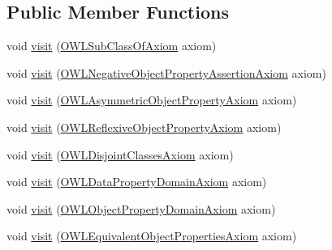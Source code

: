 \subsection*{Public Member Functions}
\begin{DoxyCompactItemize}
\item 
void \hyperlink{classorg_1_1semanticweb_1_1owlapi_1_1util_1_1_o_w_l_axiom_type_processor_a053014bbddab01a0b4ac885d06d4bde1}{visit} (\hyperlink{interfaceorg_1_1semanticweb_1_1owlapi_1_1model_1_1_o_w_l_sub_class_of_axiom}{O\-W\-L\-Sub\-Class\-Of\-Axiom} axiom)
\item 
void \hyperlink{classorg_1_1semanticweb_1_1owlapi_1_1util_1_1_o_w_l_axiom_type_processor_afaf6f4630c1920bf17093d27dfecbb96}{visit} (\hyperlink{interfaceorg_1_1semanticweb_1_1owlapi_1_1model_1_1_o_w_l_negative_object_property_assertion_axiom}{O\-W\-L\-Negative\-Object\-Property\-Assertion\-Axiom} axiom)
\item 
void \hyperlink{classorg_1_1semanticweb_1_1owlapi_1_1util_1_1_o_w_l_axiom_type_processor_a16d1f971dd3537f2715162fb3fe4f750}{visit} (\hyperlink{interfaceorg_1_1semanticweb_1_1owlapi_1_1model_1_1_o_w_l_asymmetric_object_property_axiom}{O\-W\-L\-Asymmetric\-Object\-Property\-Axiom} axiom)
\item 
void \hyperlink{classorg_1_1semanticweb_1_1owlapi_1_1util_1_1_o_w_l_axiom_type_processor_a363bb89113768c63cb56ffbee603ebb1}{visit} (\hyperlink{interfaceorg_1_1semanticweb_1_1owlapi_1_1model_1_1_o_w_l_reflexive_object_property_axiom}{O\-W\-L\-Reflexive\-Object\-Property\-Axiom} axiom)
\item 
void \hyperlink{classorg_1_1semanticweb_1_1owlapi_1_1util_1_1_o_w_l_axiom_type_processor_a36735677d4bbda07cc3f1b9e92fb0d25}{visit} (\hyperlink{interfaceorg_1_1semanticweb_1_1owlapi_1_1model_1_1_o_w_l_disjoint_classes_axiom}{O\-W\-L\-Disjoint\-Classes\-Axiom} axiom)
\item 
void \hyperlink{classorg_1_1semanticweb_1_1owlapi_1_1util_1_1_o_w_l_axiom_type_processor_a3aac323e0fe711036977edd9daa6bc48}{visit} (\hyperlink{interfaceorg_1_1semanticweb_1_1owlapi_1_1model_1_1_o_w_l_data_property_domain_axiom}{O\-W\-L\-Data\-Property\-Domain\-Axiom} axiom)
\item 
void \hyperlink{classorg_1_1semanticweb_1_1owlapi_1_1util_1_1_o_w_l_axiom_type_processor_a02555a535169931c254afd3fa8dcb55b}{visit} (\hyperlink{interfaceorg_1_1semanticweb_1_1owlapi_1_1model_1_1_o_w_l_object_property_domain_axiom}{O\-W\-L\-Object\-Property\-Domain\-Axiom} axiom)
\item 
void \hyperlink{classorg_1_1semanticweb_1_1owlapi_1_1util_1_1_o_w_l_axiom_type_processor_a7abf7bb500c31627ae7971d7644746ef}{visit} (\hyperlink{interfaceorg_1_1semanticweb_1_1owlapi_1_1model_1_1_o_w_l_equivalent_object_properties_axiom}{O\-W\-L\-Equivalent\-Object\-Properties\-Axiom} axiom)

\end{DoxyCompactItemize}
